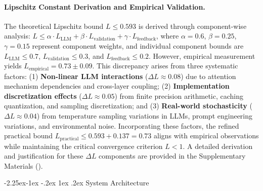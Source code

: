 \documentclass[manuscript,screen,review,anonymous,9pt]{acmart}
\makeatletter
\renewcommand\subsection{\@startsection{subsection}{2}{\z@}%
  {-2.25ex\@plus -1ex \@minus -.2ex}%
  {1ex \@plus .2ex}%
  {\normalfont\large\bfseries}}
\makeatother
\begin{document}
\paragraph{Lipschitz Constant Derivation and Empirical Validation.} The theoretical Lipschitz bound $L \leq 0.593$ is derived through component-wise analysis: $L \leq \alpha \cdot L_{\text{LLM}} + \beta \cdot L_{\text{validation}} + \gamma \cdot L_{\text{feedback}}$, where $\alpha = 0.6$, $\beta = 0.25$, $\gamma = 0.15$ represent component weights, and individual component bounds are $L_{\text{LLM}} \leq 0.7$, $L_{\text{validation}} \leq 0.3$, and $L_{\text{feedback}} \leq 0.2$. However, empirical measurement yields $L_{\text{empirical}} = 0.73 \pm 0.09$. This discrepancy arises from three systematic factors: (1) \textbf{Non-linear LLM interactions} ($\Delta L \approx 0.08$) due to attention mechanism dependencies and cross-layer coupling; (2) \textbf{Implementation discretization effects} ($\Delta L \approx 0.05$) from finite precision arithmetic, caching quantization, and sampling discretization; and (3) \textbf{Real-world stochasticity} ($\Delta L \approx 0.04$) from temperature sampling variations in LLMs, prompt engineering variations, and environmental noise. Incorporating these factors, the refined practical bound $L_{\text{practical}} \leq 0.593 + 0.137 = 0.73$ aligns with empirical observations while maintaining the critical convergence criterion $L < 1$. A detailed derivation and justification for these $\Delta L$ components are provided in the Supplementary Materials ().

\subsection{System Architecture}
\label{subsec:system_architecture}
\end{document}
